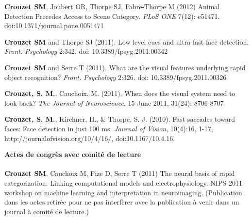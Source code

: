 \documentclass[margin,line]{resume}
\begin{document}
\begin{resume}
	\vspace{-2mm} \textbf{Crouzet SM}, Joubert OR, Thorpe SJ, Fabre-Thorpe M (2012) Animal Detection Precedes Access to Scene Category. \textit{PLoS ONE} 7(12): e51471. doi:10.1371/journal.pone.0051471

	\vspace{-2mm} \textbf{Crouzet SM} and Thorpe SJ (2011). Low level cues and ultra-fast face detection. \textit{Front. Psychology} 2:342. doi: 10.3389/fpsyg.2011.00342

	\vspace{-2mm} \textbf{Crouzet SM} and Serre T (2011). What are the visual features underlying rapid object recognition? \textit{Front. Psychology} 2:326. doi: 10.3389/fpsyg.2011.00326

	\vspace{-2mm} \textbf{Crouzet, S. M.}, Cauchoix, M. (2011). When does the visual system need to look back?  \textit{The Journal of Neuroscience}, 15 June 2011, 31(24): 8706-8707

	\vspace{-2mm} \textbf{Crouzet, S. M.}, Kirchner, H., \& Thorpe, S. J.  (2010). Fast saccades toward faces: Face detection in just 100 ms. \textit{Journal of Vision}, 10(4):16, 1-17, http://journalofvision.org/10/4/16/, doi:10.1167/10.4.16.


%
%	

\vspace{3mm}	
\textbf{Actes de congrès avec comité de lecture}\\\\
  \textbf{Crouzet SM}, Cauchoix M, Fize D, Serre T (2011) The neural basis of rapid categorization: Linking computational models and electrophysiology. NIPS 2011 workshop on machine learning and interpretation in neuroimaging. (Publication dans les actes retirée pour ne pas interfèrer avec la publication à venir dans un journal à comité de lecture.)


\end{resume}
\end{document}
